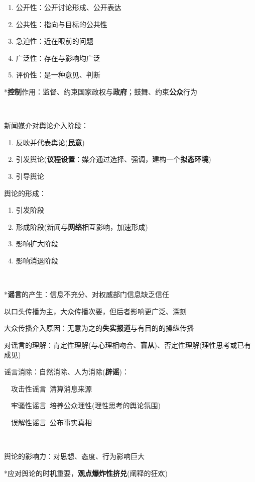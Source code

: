\documentclass[a4paper,UTF8]{ctexart}
\begin{document}
\begin{enumerate}
	\item 公开性：公开讨论形成、公开表达
	\item 公共性：指向与目标的公共性
	\item 急迫性：近在眼前的问题
	\item 广泛性：存在与影响均广泛
	\item 评价性：是一种意见、判断
\end{enumerate}

*\textbf{控制}作用：监督、约束国家政权与\textbf{政府}；鼓舞、约束\textbf{公众}行为

~

新闻媒介对舆论介入阶段：

\begin{enumerate}
	\item 反映并代表舆论(\textbf{民意})
	\item 引发舆论(\textbf{议程设置}：媒介通过选择、强调，建构一个\textbf{拟态环境})
	\item 引导舆论
\end{enumerate}

舆论的形成：

\begin{enumerate}
	\item 引发阶段
	\item 形成阶段(新闻与\textbf{网络}相互影响，加速形成)
	\item 影响扩大阶段
	\item 影响消退阶段
\end{enumerate}

~

*\textbf{谣言}的产生：信息不充分、对权威部门信息缺乏信任

以口头传播为主，大众传播次要，但后者影响更广泛、深刻

大众传播介入原因：无意为之的\textbf{失实报道}与有目的的操纵传播

对谣言的理解：肯定性理解(与心理相吻合、\textbf{盲从})、否定性理解(理性思考或已有成见)

谣言消除：自然消除、人为消除(\textbf{辟谣})：

	\ \ 攻击性谣言\ 清算消息来源
	
	\ \ 牢骚性谣言\ 培养公众理性(理性思考的舆论氛围)
	
	\ \ 误解性谣言\ 公布事实真相

~

舆论的影响力：对思想、态度、行为影响巨大

*应对舆论的时机重要，\textbf{观点爆炸性挤兑}(阐释的狂欢)
\end{document}
